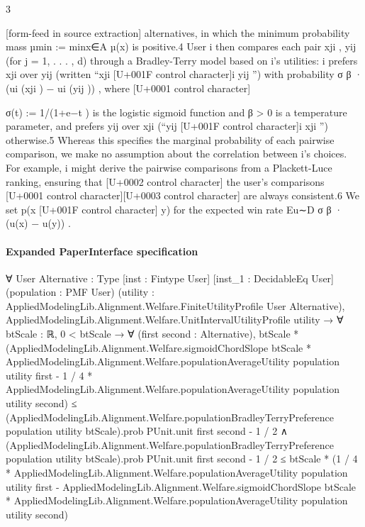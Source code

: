 \documentclass[10pt]{article}
\begin{document}
\begin{ReviewVerbatim}
                                                           3

[form-feed in source extraction]
alternatives, in which the minimum probability mass µmin := minx∈A µ(x) is positive.4 User i
then compares each pair {xji , yij } (for j = 1, . . . , d) through a Bradley-Terry model based on i’s
utilities: i prefers xji over yij (written “xji [U+001F control character]i yij ”) with probability σ β · (ui (xji ) − ui (yij )) , where
                                                                                                        [U+0001 control character]

σ(t) := 1/(1+e−t ) is the logistic sigmoid function and β > 0 is a temperature parameter, and prefers
yij over xji (“yij [U+001F control character]i xji ”) otherwise.5 Whereas this specifies the marginal probability of each pairwise
comparison, we make no assumption about the correlation between i’s choices. For example, i might
derive the pairwise comparisons from a Plackett-Luce ranking, ensuring that      [U+0002 control character] the user’s comparisons  [U+0001 control character][U+0003 control character]
are always consistent.6 We set p(x [U+001F control character] y) for the expected win rate Eu∼D σ β · (u(x) − u(y)) .
\end{ReviewVerbatim}



\paragraph{Expanded PaperInterface specification}
\begin{ReviewVerbatim}
∀ {User Alternative : Type} [inst : Fintype User] [inst_1 : DecidableEq User] (population : PMF User)
  (utility : AppliedModelingLib.Alignment.Welfare.FiniteUtilityProfile User Alternative),
  AppliedModelingLib.Alignment.Welfare.UnitIntervalUtilityProfile utility →
    ∀ {btScale : ℝ},
      0 < btScale →
        ∀ (first second : Alternative),
          btScale *
                (AppliedModelingLib.Alignment.Welfare.sigmoidChordSlope btScale *
                    AppliedModelingLib.Alignment.Welfare.populationAverageUtility population utility first -
                  1 / 4 * AppliedModelingLib.Alignment.Welfare.populationAverageUtility population utility second) ≤
              (AppliedModelingLib.Alignment.Welfare.populationBradleyTerryPreference population utility btScale).prob
                  PUnit.unit first second -
                1 / 2 ∧
            (AppliedModelingLib.Alignment.Welfare.populationBradleyTerryPreference population utility btScale).prob
                  PUnit.unit first second -
                1 / 2 ≤
              btScale *
                (1 / 4 * AppliedModelingLib.Alignment.Welfare.populationAverageUtility population utility first -
                  AppliedModelingLib.Alignment.Welfare.sigmoidChordSlope btScale *
                    AppliedModelingLib.Alignment.Welfare.populationAverageUtility population utility second)
\end{ReviewVerbatim}
\end{document}
